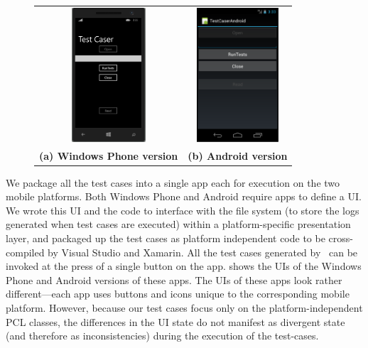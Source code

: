 \begin{figure}[t!]
\centering
\begin{tabular}{cc}
\includegraphics[keepaspectratio=true,height=5cm]{figures/windows.png} &
\includegraphics[keepaspectratio=true,height=5cm]{figures/android.png}\\
{\bf \small (a) Windows Phone version} &
{\bf \small (b) Android version}
\end{tabular}
\end{figure}

We package all the test cases into a single app each for execution on the two
mobile platforms. Both Windows Phone and Android require apps to define a UI.
We wrote this UI and the code to interface with the file system (to store the
logs generated when test cases are executed) within a  platform-specific
presentation layer, and packaged up the test cases as platform independent code
to be cross-compiled by Visual Studio and Xamarin. All the test cases generated
by \tool\ can be invoked at the press of a single button on the app.
 shows the UIs of the Windows Phone and
Android versions of these apps. The UIs of these apps look rather
different---each app uses buttons and icons unique to the corresponding mobile
platform. However, because our test cases focus only on the
platform-independent PCL classes, the differences in the UI state do not
manifest as divergent state (and therefore as inconsistencies) during the
execution of the test-cases.

